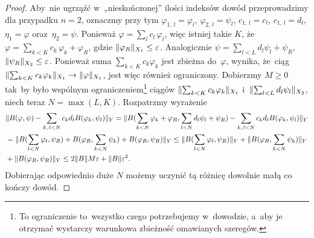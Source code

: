 \documentclass[a4paper,11pt]{article}
\begin{document}
\begin{proof}

  Aby~nie ugrząźć w~„nieskończonej” ilości indeksów dowód
  przeprowadzimy dla przypadku $n = 2$, oznaczmy przy tym
  $\varphi_{ 1,\, l } = \varphi_{ l }$, $\varphi_{ 2, \, l } = \psi_{ l }$,
  $c_{ 1, \, l } = c_{ l }$, $c_{ 1, \, l } = d_{ l }$,
  $\eta_{ 1 } = \varphi$ oraz~$\eta_{ 2 } = \psi$. Ponieważ
  $\varphi = \sum_{ l } c_{ l } \, \varphi_{ l }$, więc istniej takie $K$,
  że~$\varphi = \sum_{ k < K } c_{ k } \, \varphi_{ k } + \varphi_{ R }$, gdzie
  $\lVert{  \varphi_{ R }  }\rVert_{ X_{ 1 } } \leq \varepsilon$. Analogicznie
  $\psi = \sum_{ l < L } d_{ l } \psi_{ l } + \psi_{ R }$,
  $\lVert{  \psi_{ R }  }\rVert_{ X_{ 2 } } \leq \varepsilon$. Ponieważ suma
  $\sum_{ k < K } c_{ k } \varphi_{ k }$ jest zbieżna do~$\varphi$, wynika,
  że~ciąg
  $\lVert{  \sum_{ k < K } c_{ k } \varphi_{ k }  }\rVert_{ X_{ 1 } } \to \lVert{ 
    \varphi  }\rVert_{ X_{ 1 } }$, jest więc również ograniczony. Dobierzmy
  $M \geq 0$ tak~by było wspólnym ograniczeniem\footnote{To
    ograniczenie to~wszystko czego potrzebujemy w~dowodzie, a~aby je
    otrzymać wystarczy warunkowa zbieżność omawianych szeregów.}
  ciągów $\lVert{  \sum_{ k < K } c_{ k } \varphi_{ k }  }\rVert_{ X_{ 1 } }$
  i~$\lVert{  \sum_{ l < L } d_{ l } \psi_{ l }  }\rVert_{ X_{ 2 } }$, niech
  teraz $N = \max( L, K )$. Rozpatrzmy wyrażenie
  \begin{equation}
    \begin{split}
      \label{eq:RS-Vol-I-s02-06}
      &\Vert B( \varphi, \psi ) - \sum_{ k, \, l < N } c_{ k } d_{ l }
        B( \varphi_{ k }, \psi_{ l } ) \Vert_{ Y }
        =
        \Vert B( \sum_{ k < N } \varphi_{ k } + \varphi_{ R }, \sum_{ l < N } d_{ l } \psi_{ l }
        + \psi_{ R } ) - \sum_{ k,\, l < N } c_{ k } d_{ l }
        B( \varphi_{ k }, \psi_{ l } ) \Vert_{ Y } \\
      &=
        \Vert B( \sum_{ l < N } \varphi_{ l }, \psi_{ R } )
        + B( \varphi_{ R }, \sum_{ k < N } \psi_{ k } )
        + B( \varphi_{ R }, \psi_{ R } ) \Vert_{ Y }
        \leq
        \Vert B( \sum_{ l < N } \varphi_{ l }, \psi_{ R } ) \Vert_{ Y }
        + \Vert B( \varphi_{ R }, \sum_{ k < N } \psi_{ k } ) \Vert_{ Y } \\
      &+ \Vert B( \varphi_{ R }, \psi_{ R } ) \Vert_{ Y }
        \leq 2 \lVert{  B  }\rVert M \varepsilon + \lVert{  B  }\rVert \varepsilon^{ 2 }.
    \end{split}
  \end{equation}
  Dobierając odpowiednio duże $N$ możemy uczynić tą różnicę dowolnie
  małą co kończy dowód.

\end{proof}
\end{document}
